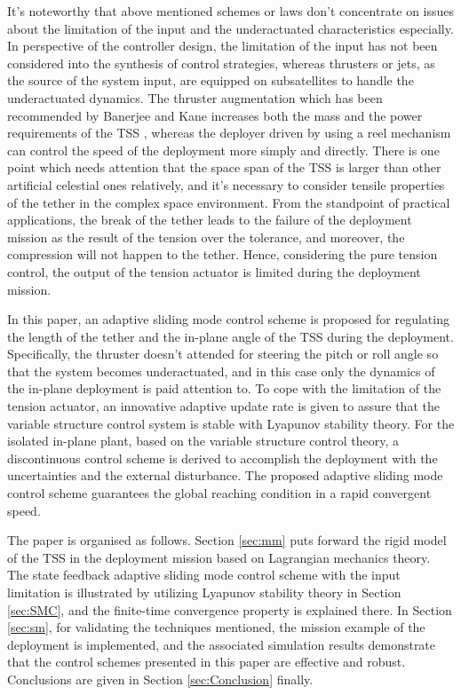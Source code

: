 \documentclass[3p]{elsarticle}
\theoremstyle{plain}
\begin{document}
It's noteworthy that above mentioned schemes or laws don't concentrate on issues about the limitation of the input and the underactuated characteristics especially. In perspective of the controller design, the limitation of the input has not been considered into the synthesis of control strategies, whereas thrusters or jets, as the source of the system input, are equipped on subsatellites to handle the underactuated dynamics. The thruster augmentation which has been recommended by Banerjee and Kane increases both the mass and the power requirements of the TSS \cite{banerjee1984tethered}, whereas the deployer driven by using a reel mechanism can control the speed of the deployment more simply and directly. There is one point which needs attention that the space span of the TSS is larger than other artificial celestial ones relatively, and it's necessary to consider tensile properties of the tether in the complex space environment. From the standpoint of practical applications, the break of the tether leads to the failure of the deployment mission as the result of the tension over the tolerance, and moreover, the compression will not happen to the tether. Hence, considering the pure tension control, the output of the tension actuator is limited during the deployment mission.\par
In this paper, an adaptive sliding mode control scheme is proposed for regulating the length of the tether and the in-plane angle of the TSS during the deployment. Specifically, the thruster doesn't attended for steering the pitch or roll angle so that the system becomes underactuated, and in this case only the dynamics of the in-plane deployment is paid attention to. To cope with the limitation of the tension actuator, an innovative adaptive update rate is given to assure that the variable structure control system is stable with Lyapunov stability theory. For the isolated in-plane plant, based on the variable structure control theory, a discontinuous control scheme is derived to accomplish the deployment with the uncertainties and the external disturbance. The proposed adaptive sliding mode control scheme guarantees the global reaching condition in a rapid convergent speed.\par
The paper is organised as follows. Section \ref{sec:mm} puts forward the rigid model of the TSS in the deployment mission based on Lagrangian mechanics theory. The state feedback adaptive sliding mode control scheme with the input limitation is illustrated by utilizing Lyapunov stability theory in Section \ref{sec:SMC}, and the finite-time convergence property is explained there. In Section \ref{sec:sm}, for validating the techniques mentioned, the mission example of the deployment is implemented, and the associated simulation results demonstrate that the control schemes presented in this paper are effective and robust. Conclusions are given in Section \ref{sec:Conclusion} finally.
\end{document}

